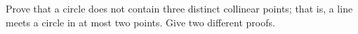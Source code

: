 Prove that a circle does not contain three distinct collinear points; that is, a line meets a circle in at most two points. Give two different proofs.
